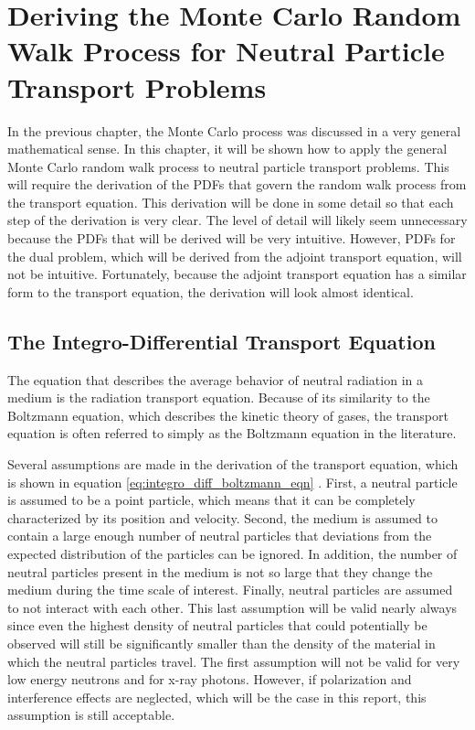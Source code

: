 \chapter{Deriving the Monte Carlo Random Walk Process for Neutral Particle Transport Problems}
\label{ch:neutral_particle_transport}
In the previous chapter, the Monte Carlo process was discussed in a very
general mathematical sense. In this chapter, it will be shown how to apply
the general Monte Carlo random walk process to neutral particle transport 
problems. This will require the derivation of the PDFs that govern the random 
walk process from the transport equation. This derivation will be done in
some detail so that each step of the derivation is very clear. The level of
detail will likely seem unnecessary because the PDFs that will be derived
will be very intuitive. However, PDFs for the dual problem, which will be
derived from the adjoint transport equation, will not be intuitive. 
Fortunately, because the adjoint transport equation has a similar form to the
transport equation, the derivation will look almost identical. 

\section{The Integro-Differential Transport Equation}
\label{sec:int_diff_transport_eqn}
The equation that describes the average behavior of neutral radiation in a 
medium is the radiation transport equation. Because of its similarity to the 
Boltzmann equation, which describes the kinetic theory of gases, the 
transport equation is often referred to simply as the Boltzmann equation in the 
literature. 

Several assumptions are made in the derivation of the transport 
equation, which is shown in equation \ref{eq:integro_diff_boltzmann_eqn} 
\citep{bell_nuclear_1979}. First, a neutral particle is assumed to be a point 
particle, which means that it can be completely characterized by its position 
and velocity. Second, the medium is assumed to contain a large enough number of 
neutral particles that deviations from the expected distribution of the 
particles can be ignored. In addition, the number of neutral particles 
present in the medium is not so large that they change the medium during the 
time scale of interest. Finally, neutral particles are assumed to not interact 
with each other. This last assumption will be valid nearly always since even 
the highest density of neutral particles that could potentially be observed 
will still be significantly smaller than the density of the material in which 
the neutral particles travel. The first assumption will not be valid for very 
low energy neutrons and for x-ray photons. However, if polarization and 
interference effects are neglected, which will be the case in this report,
this assumption is still acceptable. 

